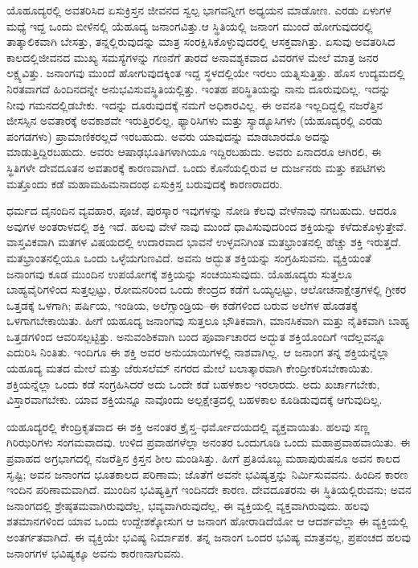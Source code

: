 ಯೊಹೂದ್ಯರಲ್ಲಿ ಅವತರಿಸಿದ ಏಸುಕ್ರಿಸ್ತನ ಜೀವನದ ಸ್ವಲ್ಪ ಭಾಗವನ್ನೀಗ ಅಧ್ಯಯನ ಮಾಡೋಣ. ಎರಡು ಏಳುಗಳ ಮಧ್ಯೆ ಇದ್ದ ಒಂದು ಬೀಳಿನಲ್ಲಿ ಯೆಹೂದ್ಯ ಜನಾಂಗವಿತ್ತು.\break ಆ ಸ್ಥಿತಿಯಲ್ಲಿ ಜನಾಂಗ ಮುಂದೆ ಹೋಗುವುದರಲ್ಲಿ ತಾತ್ಕಾಲಿಕವಾಗಿ ಬೇಸತ್ತು, ತನ್ನಲ್ಲಿರುವುದನ್ನು ಮಾತ್ರ ಸಂರಕ್ಷಿಸಿಕೊಳ್ಳುವುದರಲ್ಲಿ ಆಸಕ್ತವಾಗಿತ್ತು. ಏಸುವು ಅವತರಿಸಿದ ಕಾಲದಲ್ಲಿ\break ಜೀವನದ ಮುಖ್ಯ ಸಮಸ್ಯೆಗಳನ್ನು ಗಣನೆಗೆ ತಾರದೆ ಅನಾವಶ್ಯಕವಾದ ವಿವರಗಳ ಮೇಲೆ ಮಾತ್ರ ಜನರ ಲಕ್ಷ್ಯವಿತ್ತು. ಜನಾಂಗವು ಮುಂದೆ ಹೋಗುವುದಕ್ಕಿಂತ ಇದ್ದ ಸ್ಥಳದಲ್ಲಿಯೇ ಇರಲು ಯತ್ನಿಸುತ್ತಿತ್ತು. ಹೊಸ ಉದ್ಯಮದಲ್ಲಿ ನಿರತವಾಗದೆ ಹಿಂದಿನದನ್ನೇ ಅನುಭವಿಸುವ\break ಸ್ಥಿತಿಯಲ್ಲಿತ್ತು. ಇಂತಹ ಪರಿಸ್ಥಿತಿಯನ್ನು ನಾನು ದೂರುವುದಿಲ್ಲ. ಇದನ್ನು ನೀವು ಗಮನದಲ್ಲಿಡಬೇಕು. ಇದನ್ನು ದೂರುವುದಕ್ಕೆ ನಮಗೆ ಅಧಿಕಾರವಿಲ್ಲ. ಈ ಅವನತಿ ಇಲ್ಲದಿದ್ದಲ್ಲಿ ನಜರೆತ್ತಿನ ಜೀಸಸ್ಸಿನ ಅವತಾರಕ್ಕೆ ಅವಕಾಶವೇ ಇರುತ್ತಿರಲಿಲ್ಲ. ಫ್ಯಾರಿಸಿಗಳು ಮತ್ತು ಸ್ಯಾಡ್ಯೂಸಿಗಳು (ಯೆಹೂದ್ಯರಲ್ಲಿ ಎರಡು ಪಂಗಡಗಳು) ಪ್ರಾಮಾಣಿಕರಲ್ಲದೆ ಇರಬಹುದು. ಅವರು ಯಾವುದನ್ನು ಮಾಡಬಾರದೊ ಅದನ್ನು ಮಾಡುತ್ತಿದ್ದಿರಬಹುದು. ಅವರು ಆಷಾಢಭೂತಿಗಳಾಗಿಯೂ ಇದ್ದಿರಬಹುದು. ಅವರು ಏನಾದರೂ ಆಗಿರಲಿ, ಈ ಸ್ಥಿತಿಗಳೇ ದೇವದೂತನ ಅವತಾರಕ್ಕೆ ಕಾರಣವಾಗಿದೆ. ಒಂದು ಕೊನೆಯಲ್ಲಿರುವ ಆ ದುರ್ಜನರು ಮತ್ತು ಕಪಟಿಗಳು ಮತ್ತೊಂದು ಕಡೆ ಮಹಾಮಹಿಮನಾದಂಥ ಏಸುಕ್ರಿಸ್ತ ಬರುವುದಕ್ಕೆ ಕಾರಣರಾದರು.

ಧರ್ಮದ ದೈನಂದಿನ ವ್ಯವಹಾರ, ಪೂಜೆ, ಪುರಸ್ಕಾರ ಇವುಗಳನ್ನು ನೋಡಿ ಕೆಲವು ವೇಳೆ\break ನಾವು ನಗಬಹುದು. ಆದರೂ ಅವುಗಳ ಅಂತರಾಳದಲ್ಲಿ ಶಕ್ತಿ ಇದೆ. ಹಲವು ವೇಳೆ ನಾವು ಮುಂದೆ ಧಾವಿಸುವುದರಿಂದ ಶಕ್ತಿಯನ್ನು ಕಳೆದುಕೊಳ್ಳುತ್ತೇವೆ. ವಾಸ್ತವಿಕವಾಗಿ ಮತಗಳ ವಿಷಯದಲ್ಲಿ ಉದಾರವಾದ ಭಾವನೆ ಉಳ್ಳವನಿಗಿಂತ ಮತಭ್ರಾಂತನಲ್ಲಿ ಹೆಚ್ಚು ಶಕ್ತಿ ಇರುತ್ತದೆ. ಮತಭ್ರಾಂತನಲ್ಲಿಯೂ ಒಂದು ಒಳ್ಳೆಯಗುಣವಿದೆ. ಅವನು ಅದ್ಭುತ ಶಕ್ತಿಯನ್ನು ಸಂಗ್ರಹಿಸುವನು. ವ್ಯಕ್ತಿಯಂತೆ ಜನಾಂಗವು ಕೂಡ ಮುಂದಿನ ಉಪಯೋಗಕ್ಕೆ ಶಕ್ತಿಯನ್ನು ಸಂಚಯಿಸುವುದು. ಯೊಹೂದ್ಯರು ಸುತ್ತಲೂ ಬಾಹ್ಯವೈರಿಗಳಿಂದ ಸುತ್ತಲ್ಪಟ್ಟು, ರೋಮನರಿಂದ ಒಂದು ಕೇಂದ್ರದ ಕಡೆಗೆ ಒಯ್ಯಲ್ಪಟ್ಟು, ಆಲೋಚನಾಕ್ಷೇತ್ರಗಳಲ್ಲಿ ಗ್ರೀಕರ ಒತ್ತಡಕ್ಕೆ ಒಳಗಾಗಿ; ಪರ್ಷಿಯ, ಇಂಡಿಯ, ಅಲೆಗ್ಸಾಂಡ್ರಿಯ–ಈ ಕಡೆಗಳಿಂದ ಬರುವ ಅಲೆಗಳ ಹೊಡತಕ್ಕೆ ಒಳಗಾಗಬೇಕಾಯಿತು. ಹೀಗೆ ಯಹೂದ್ಯ ಜನಾಂಗವು ಸುತ್ತಲೂ ಭೌತಿಕವಾಗಿ, ಮಾನಸಿಕವಾಗಿ ಮತ್ತು ನೈತಿಕವಾಗಿ ಬಾಹ್ಯ ಒತ್ತಡಗಳಿಂದ ಆವರಿಸಲ್ಪಟ್ಟಿತ್ತು. ಅನುವಂಶಿಕವಾಗಿ ಬಂದ ಪೂರ್ವಾಚಾರದ ಅದ್ಭುತ ಶಕ್ತಿಯೊಂದಿಗೆ ಇದೆಲ್ಲವನ್ನೂ ಎದುರಿಸಿ ನಿಂತಿತು. ಇಂದಿಗೂ ಈ ಶಕ್ತಿ ಅವರ ಅನುಯಾಯಿಗಳಲ್ಲಿ ನಾಶವಾಗಿಲ್ಲ. ಆ ಜನಾಂಗ ತನ್ನ ಶಕ್ತಿಯನ್ನೆಲ್ಲಾ ಯಹೂದ್ಯ ಮತದ ಮೇಲೆ ಮತ್ತು ಜೆರುಸಲೆಮ್​ ನಗರದ ಮೇಲೆ ಬಲಾತ್ಕಾರವಾಗಿ ಕೇಂದ್ರೀಕರಿಸಬೇಕಾಯಿತು. ಶಕ್ತಿಯನ್ನೆಲ್ಲಾ ಒಂದು ಕಡೆ ಸಂಗ್ರಹಿಸಿದರೆ ಅದು ಒಂದೇ ಕಡೆ ಬಹಳಕಾಲ ಇರಲಾರದು. ಅದು ಖರ್ಚಾಗಬೇಕು, ವಿಸ್ತಾರವಾಗಬೇಕು. ಯಾವ ಶಕ್ತಿಯನ್ನೂ ನಾವೊಂದು ಅಲ್ಪಕ್ಷೇತ್ರದಲ್ಲಿ ಬಹಳಕಾಲ ಕೂಡಿಡುವುದಕ್ಕೆ ಆಗುವುದಿಲ್ಲ.

ಯಹೂದ್ಯರಲ್ಲಿ ಕೇಂದ್ರಿಕೃತವಾದ ಈ ಶಕ್ತಿ ಅನಂತರ ಕ್ರೈಸ್ತ–ಧರ್ಮೋದಯದಲ್ಲಿ ವ್ಯಕ್ತವಾಯಿತು. ಹಲವು ಸಣ್ಣ ಗಿರಿಝರಿಗಳು ಸಂಗಮವಾದವು. ಉಳಿದ ಪ್ರವಾಹಗಳೆಲ್ಲಾ ಅನಂತರ ಒಂದುಗೂಡಿ ಒಂದು ಮಹಾಪ್ರವಾಹವಾಯಿತು. ಈ ಪ್ರವಾಹದ ಅಗ್ರಭಾಗದಲ್ಲಿ ನಜರೆತ್ತಿನ ಕ್ರಿಸ್ತನ ಶೀಲ ಮಂಡಿಸಿತ್ತು. ಹೀಗೆ ಪ್ರತಿಯೊಬ್ಬ ಮಹಾಪುರುಷನೂ ಅವನ ಕಾಲದ ಸೃಷ್ಟಿ; ಅವನ ಜನಾಂಗದ ಭೂತಕಾಲದ ಪರಿಣಾಮ; ಜೊತೆಗೆ ಅವನೇ ಭವಿಷ್ಯತ್ತನ್ನು ನಿರ್ಮಿಸುವವನು. ಹಿಂದಿನ ಕಾರಣ ಇಂದಿನ ಪರಿಣಾಮವಾಗಿದೆ. ಮುಂದಿನ ಭವಿಷ್ಯತ್ತಿಗೆ ಇಂದಿನದೇ ಕಾರಣ. ದೇವದೂತರನು ಈ ಸ್ಥಿತಿಯಲ್ಲಿರುವನು; ಅವನ ಜನಾಂಗದಲ್ಲಿ ಶ್ರೇಷ್ಠತಮವಾಗಿರುವುದೆಲ್ಲ, ಭವ್ಯವಾಗಿರುವುದೆಲ್ಲ, ಈ ವ್ಯಕ್ತಿಯಲ್ಲಿ ವ್ಯಕ್ತವಾಗಿರುವುದು. ಹಲವು ಶತಮಾನಗಳಿಂದ ಯಾವ ಒಂದು ಉದ್ದೇಶಕ್ಕೋಸುಗ ಆ ಜನಾಂಗ ಹೋರಾಡಿದೆಯೋ ಆ ಆದರ್ಶವೆಲ್ಲಾ ಈ ವ್ಯಕ್ತಿಯಲ್ಲಿ ಅಂತರ್ಗತವಾಗಿದೆ. ಈ ವ್ಯಕ್ತಿಯೇ ಭವಿಷ್ಯ ನಿರ್ಮಾಪಕ. ತನ್ನ ಜನಾಂಗ ಒಂದರ ಭವಿಷ್ಯ ಮಾತ್ರವಲ್ಲ, ಪ್ರಪಂಚದ ಹಲವು ಜನಾಂಗಗಳ ಭವಿಷ್ಯಕ್ಕೂ ಅವನು ಕಾರಣನಾಗುವನು.

